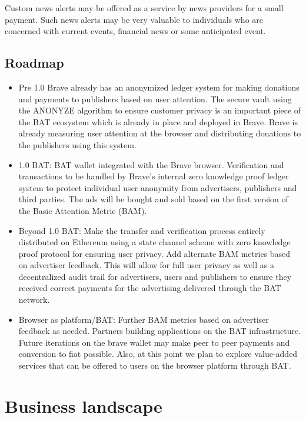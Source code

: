 \documentclass[11pt]{article}
\begin{document}
Custom news alerts may be offered as a service by news providers for a small payment. Such news alerts may be very valuable to individuals who are concerned with current events, financial news or some anticipated event. 
\subsection{Roadmap}
\label{sec-4-5}
\begin{itemize}
\item{Pre 1.0 Brave already has an anonymized ledger system for making donations and payments to publishers based on user attention. The secure vault using the ANONYZE algorithm to ensure customer privacy is an important piece of the BAT ecosystem which is already in place and deployed in Brave. Brave is already measuring user attention at the browser and distributing donations to the publishers using this system.}
\item{1.0 BAT: BAT wallet integrated with the Brave browser. Verification and transactions to be handled by Brave’s internal zero knowledge proof ledger system to protect individual user anonymity from advertisers, publishers and third parties. The ads will be bought and sold based on the first version of the Basic Attention Metric (BAM). }
\item{Beyond 1.0 BAT: Make the transfer and verification process entirely distributed on Ethereum using a state channel scheme with zero knowledge proof protocol for ensuring user privacy. Add alternate BAM metrics based on advertiser feedback. This will allow for full user privacy as well as a decentralized audit trail for advertisers, users and publishers to ensure they received correct payments for the advertising delivered through the BAT network.}
\item{Browser as platform/BAT:  Further BAM metrics based on advertiser feedback as needed. Partners building applications on the BAT infrastructure. Future iterations on the brave wallet may make peer to
peer payments and conversion to fiat possible. Also, at this point we plan to explore value-added services that can be offered to users on the browser platform through BAT.}
\end{itemize}


\section{Business landscape}
\label{sec-5}
\end{document}
